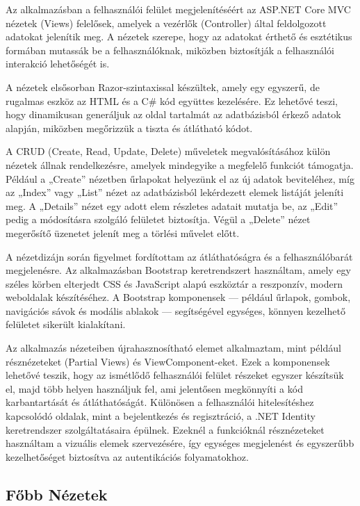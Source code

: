 Az alkalmazásban a felhasználói felület megjelenítéséért az ASP.NET Core MVC nézetek (Views) felelősek, amelyek a vezérlők (Controller) által feldolgozott adatokat jelenítik meg. A nézetek szerepe, hogy az adatokat érthető és esztétikus formában mutassák be a felhasználóknak, miközben biztosítják a felhasználói interakció lehetőségét is.

A nézetek elsősorban Razor-szintaxissal készültek, amely egy egyszerű, de rugalmas eszköz az HTML és a C\# kód együttes kezelésére. Ez lehetővé teszi, hogy dinamikusan generáljuk az oldal tartalmát az adatbázisból érkező adatok alapján, miközben megőrizzük a tiszta és átlátható kódot.

A CRUD (Create, Read, Update, Delete) műveletek megvalósításához külön nézetek állnak rendelkezésre, amelyek mindegyike a megfelelő funkciót támogatja. Például a „Create” nézetben űrlapokat helyezünk el az új adatok beviteléhez, míg az „Index” vagy „List” nézet az adatbázisból lekérdezett elemek listáját jeleníti meg. A „Details” nézet egy adott elem részletes adatait mutatja be, az „Edit” pedig a módosításra szolgáló felületet biztosítja. Végül a „Delete” nézet megerősítő üzenetet jelenít meg a törlési művelet előtt.

A nézetdizájn során figyelmet fordítottam az átláthatóságra és a felhasználóbarát megjelenésre. Az alkalmazásban Bootstrap keretrendszert használtam, amely egy széles körben elterjedt CSS és JavaScript alapú eszköztár a reszponzív, modern weboldalak készítéséhez. A Bootstrap komponensek — például űrlapok, gombok, navigációs sávok és modális ablakok — segítségével egységes, könnyen kezelhető felületet sikerült kialakítani.

Az alkalmazás nézeteiben újrahasznosítható elemet alkalmaztam, mint például résznézeteket (Partial Views) és ViewComponent-eket. Ezek a komponensek lehetővé teszik, hogy az ismétlődő felhasználói felület részeket egyszer készítsük el, majd több helyen használjuk fel, ami jelentősen megkönnyíti a kód karbantartását és átláthatóságát. Különösen a felhasználói hitelesítéshez kapcsolódó oldalak, mint a bejelentkezés és regisztráció, a .NET Identity keretrendszer szolgáltatásaira épülnek. Ezeknél a funkcióknál résznézeteket használtam a vizuális elemek szervezésére, így egységes megjelenést és egyszerűbb kezelhetőséget biztosítva az autentikációs folyamatokhoz.

\subsection{Főbb Nézetek}
